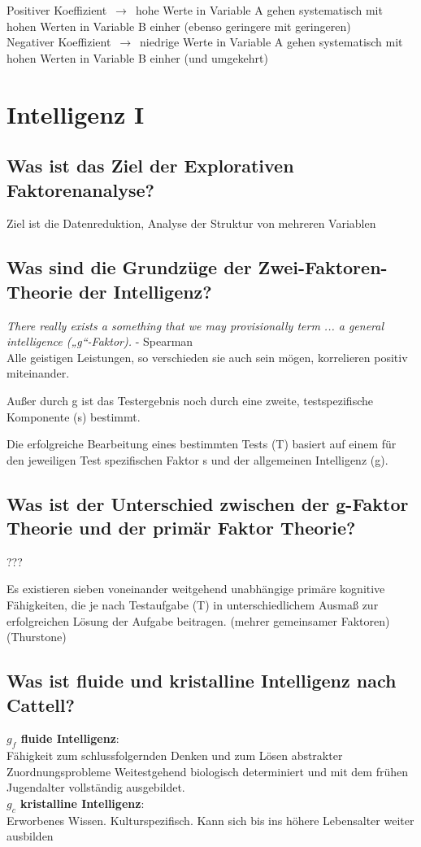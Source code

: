\documentclass[a6paper,10pt,DIV=40]{scrartcl}
\begin{document}
Positiver Koeffizient  $\,\to\,$ hohe Werte in Variable A gehen systematisch mit hohen Werten in Variable B einher (ebenso geringere mit geringeren)\\
Negativer Koeffizient  $\,\to\,$ niedrige Werte in Variable A gehen systematisch mit hohen Werten in Variable B einher (und umgekehrt)

\section{Intelligenz I}

\subsection{Was ist das Ziel der Explorativen Faktorenanalyse?}
Ziel ist die Datenreduktion, Analyse der Struktur von mehreren Variablen
\subsection{Was sind die Grundzüge der Zwei-Faktoren-Theorie der Intelligenz?}
\textit{There really exists a something that we may provisionally term ... a general intelligence („g“-Faktor).} - Spearman\\

Alle geistigen Leistungen, so verschieden sie auch sein mögen, korrelieren positiv miteinander.

Außer durch g ist das Testergebnis noch durch eine zweite, testspezifische Komponente (s) bestimmt.

Die erfolgreiche Bearbeitung eines bestimmten Tests (T) basiert auf einem für den jeweiligen Test spezifischen Faktor s und der allgemeinen Intelligenz (g).
\subsection{Was ist der Unterschied zwischen der g-Faktor Theorie und der primär Faktor Theorie?}
???

Es existieren sieben voneinander weitgehend unabhängige primäre kognitive Fähigkeiten, die je nach Testaufgabe (T) in unterschiedlichem Ausmaß zur erfolgreichen Lösung der Aufgabe beitragen.
    (mehrer gemeinsamer Faktoren) (Thurstone)
\subsection{Was ist fluide und kristalline Intelligenz nach Cattell?}
    \textbf{$g_f$ fluide Intelligenz}:\\
    Fähigkeit zum schlussfolgernden Denken und zum Lösen abstrakter Zuordnungsprobleme
    Weitestgehend biologisch determiniert und mit dem frühen Jugendalter vollständig ausgebildet.\\
    \textbf{$g_c$ kristalline Intelligenz}:\\
    Erworbenes Wissen. Kulturspezifisch. Kann sich bis ins höhere Lebensalter weiter ausbilden
\end{document}
